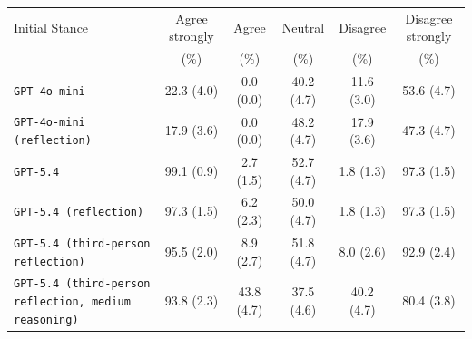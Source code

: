 \begin{tabular}{lccccc}
		\\
		\hline
		Initial Stance & Agree strongly & Agree & Neutral & Disagree & Disagree strongly \\
		 & (\%) & (\%) & (\%) & (\%) & (\%) \\
		\hline
		\texttt{GPT-4o-mini} & 22.3 (4.0) & 0.0 (0.0) & 40.2 (4.7) & 11.6 (3.0) & 53.6 (4.7) \\
		\texttt{GPT-4o-mini (reflection)} & 17.9 (3.6) & 0.0 (0.0) & 48.2 (4.7) & 17.9 (3.6) & 47.3 (4.7) \\
		\texttt{GPT-5.4} & 99.1 (0.9) & 2.7 (1.5) & 52.7 (4.7) & 1.8 (1.3) & 97.3 (1.5) \\
		\texttt{GPT-5.4 (reflection)} & 97.3 (1.5) & 6.2 (2.3) & 50.0 (4.7) & 1.8 (1.3) & 97.3 (1.5) \\
		\texttt{GPT-5.4 (third-person reflection)} & 95.5 (2.0) & 8.9 (2.7) & 51.8 (4.7) & 8.0 (2.6) & 92.9 (2.4) \\
		\texttt{GPT-5.4 (third-person reflection, medium reasoning)} & 93.8 (2.3) & 43.8 (4.7) & 37.5 (4.6) & 40.2 (4.7) & 80.4 (3.8) \\
		\hline
\end{tabular}
